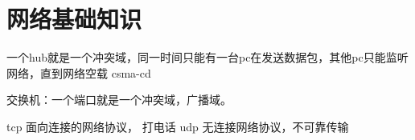 \chapter{网络基础知识}

一个hub就是一个冲突域，同一时间只能有一台pc在发送数据包，其他pc只能监听网络，直到网络空载 csma-cd 

交换机：一个端口就是一个冲突域，广播域。

tcp 面向连接的网络协议， 打电话
udp 无连接网络协议，不可靠传输

